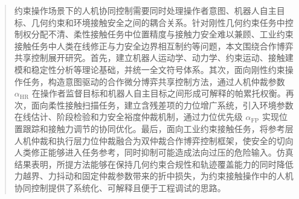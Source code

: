 
\begin{abstract}
约束操作场景下的人机协同控制需要同时处理操作者意图、机器人自主目标、几何约束和环境接触安全之间的耦合关系。针对刚性几何约束任务中控制权分配不清、柔性接触任务中位置精度与接触力安全难以兼顾、工业约束接触任务中人类在线修正与力安全边界相互制约等问题，本文围绕合作博弈共享控制展开研究。首先，建立机器人运动学、动力学、约束运动、接触建模和稳定性分析等理论基础，并统一全文符号体系。其次，面向刚性约束操作任务，构造意图驱动的合作微分博弈共享控制方法，通过人机仲裁参数 $\alpha_{\mathrm{HR}}$ 在操作者监督目标和机器人自主目标之间形成可解释的帕累托权衡。再次，面向柔性接触扫描任务，建立含残差项的力位增广系统，引入环境参数在线估计、阶段检验和力安全裕度仲裁机制，通过力位优先级 $\alpha_{\mathrm{FP}}$ 实现位置跟踪和接触力调节的协同优化。最后，面向工业约束接触任务，将参考层人机仲裁和执行层力位仲裁融合为双仲裁合作博弈控制框架，使安全的切向人类修正能够进入任务参考，同时抑制可能造成法向过压的危险输入。仿真结果表明，所提方法能够在保持几何约束合规性和轨迹覆盖能力的同时降低力越界、力抖动和固定仲裁参数带来的折中损失，为约束接触操作中的人机协同控制提供了系统化、可解释且便于工程调试的思路。

\end{abstract}

